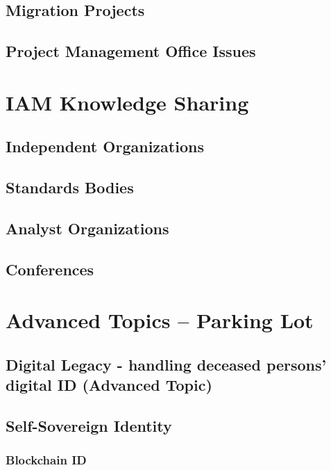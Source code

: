 \hypertarget{migration-projects}{%
\section{Migration Projects}\label{migration-projects}}

\hypertarget{project-management-office-issues}{%
\section{Project Management Office
Issues~~}\label{project-management-office-issues}}

\hypertarget{iam-knowledge-sharing}{%
\chapter{IAM Knowledge Sharing}\label{iam-knowledge-sharing}}

\hypertarget{independent-organizations}{%
\section{Independent Organizations}\label{independent-organizations}}

\hypertarget{standards-bodies}{%
\section{Standards Bodies}\label{standards-bodies}}

\hypertarget{analyst-organizations}{%
\section{Analyst Organizations}\label{analyst-organizations}}

\hypertarget{conferences}{%
\section{Conferences}\label{conferences}}

\hypertarget{advanced-topics-parking-lot}{%
\chapter{Advanced Topics -- Parking
Lot}\label{advanced-topics-parking-lot}}

\hypertarget{digital-legacy---handling-deceased-persons-digital-id-advanced-topic}{%
\section{Digital Legacy - handling deceased persons' digital ID
(Advanced
Topic)}\label{digital-legacy---handling-deceased-persons-digital-id-advanced-topic}}

\hypertarget{self-sovereign-identity}{%
\section{Self-Sovereign Identity}\label{self-sovereign-identity}}

\hypertarget{blockchain-id}{%
\subsection{Blockchain ID}\label{blockchain-id}}
